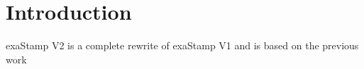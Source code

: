 \section{Introduction}
\label{sec:introduction}

exaStamp V2 is a complete rewrite of exaStamp V1 and is based on the previous work \cite{Soulard2008}

